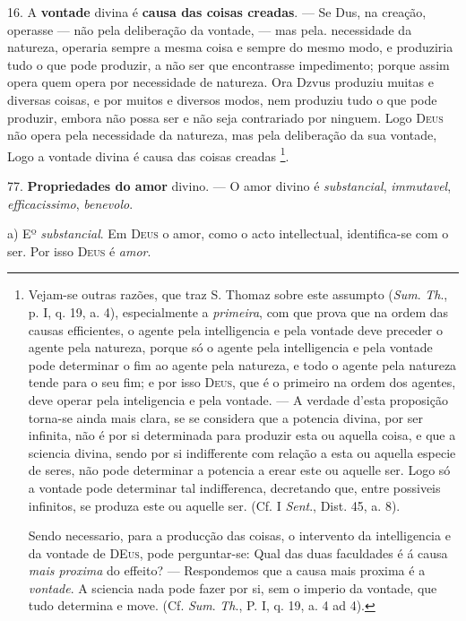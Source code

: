 16. A \textbf{vontade} divina é \textbf{causa das coisas creadas}. --- Se Dus, na creação, operasse --- não pela deliberação da vontade, --- mas pela. necessidade da natureza, operaria sempre a mesma    coisa e sempre do mesmo modo, e produziria tudo o que pode produzir, a não ser que encontrasse impedimento; porque assim opera quem opera por necessidade de natureza. Ora   Dzvus produziu muitas e diversas coisas, e por muitos e diversos modos, nem produziu tudo o que pode produzir, embora   não possa ser e não seja contrariado por ninguem. Logo \textsc{Deus} não opera pela necessidade da natureza, mas pela deliberação   da sua vontade, Logo a vontade divina é causa das coisas creadas \footnote{Vejam-se outras razões, que traz S. Thomaz sobre este assumpto (\emph{Sum}. \emph{Th}., p. I, q. 19, a. 4), especialmente a \emph{primeira}, com que prova que na ordem das causas efficientes, o agente pela intelligencia e pela vontade deve preceder o agente pela natureza, porque só o agente pela intelligencia e pela vontade pode determinar o fim ao agente pela natureza, e todo o agente pela natureza tende para o seu fim; e por isso \textsc{Deus}, que é o primeiro na ordem dos agentes, deve operar pela inteligencia e pela vontade. --- A verdade d'esta proposição torna-se ainda mais clara, se se considera que a potencia divina, por ser infinita, não é por si determinada para produzir esta ou aquella coisa, e que a sciencia divina, sendo por si indifferente com relação a esta ou aquella especie de seres, não pode determinar a potencia a erear este ou aquelle ser. Logo só a vontade pode determinar tal indifferenca, decretando que, entre possiveis infinitos, se produza este ou aquelle ser. (Cf. I \emph{Sent}., Dist. 45, a. 8).\par Sendo necessario, para a producção das coisas, o intervento da intelligencia e da vontade de \textsc{DEus}, pode perguntar-se: Qual das duas faculdades é á causa \emph{mais proxima} do effeito? --- Respondemos que a causa mais proxima é a \emph{vontade}. A sciencia nada pode fazer por si, sem o imperio da vontade, que tudo determina e move. (Cf. \emph{Sum}. \emph{Th}., P. I, q. 19, a. 4 ad 4).}.

77. \textbf{Propriedades do amor} divino. --- O amor divino é \emph{substancial}, \emph{immutavel}, \emph{efficacissimo}, \emph{benevolo}.

a) Eº \emph{substancial}. Em \textsc{Deus} o amor, como o acto intellectual, identifica-se com o ser. Por isso \textsc{Deus} é \emph{amor}.

